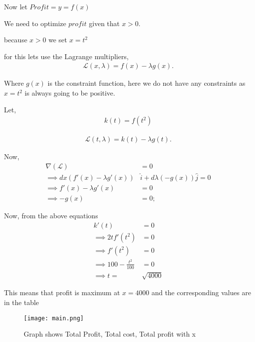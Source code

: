 \documentclass[journal,12pt,twocolumn]{IEEEtran}
\begin{document}
	Now let $Profit = y = f(x)$
	
	
	We need to optimize $profit$ given that $x > 0$.
	
	because $x>0$ we set $x = t^2$
	
	for this lets use the Lagrange multipliers,
	\begin{align}
	    \mathcal{L}(x, \lambda) = f(x) - \lambda g(x).
	\end{align}
	
	Where $g(x)$ is the constraint function, here we do not have any constraints as $x = t^2$
	is always going to be positive.
	
	Let,
	\begin{align}
	    k(t) = f(t^2)
	\end{align}
	
	\begin{align}
	    \mathcal{L}(t, \lambda) = k(t) - \lambda g(t).
	\end{align}
	
	Now,
	\begin{align}
	    \nabla(\mathcal{L}) &= 0\\
	    \implies dx(f'(x) - \lambda g'(x)) &\hat{i} + d\lambda (-g(x)) \hat{j} = 0 \\
	    \implies f'(x) - \lambda g'(x) &= 0 \\
	    \implies -g(x) &= 0;
	\end{align}
	
	Now, from the above equations
	\begin{align}
	    k'(t) &= 0 \\
	    \implies 2tf'(t^2) &= 0 \\ 
	    \implies f'(t^2) &= 0\\
	    \implies 100 - \frac{t^2}{100} &= 0 \\
	    \implies t =& \sqrt{4000}
	\end{align}
	
	This means that profit is maximum at $x=4000$ and the corresponding values are in the table
		
\begin{table}[h]
    \centering
	
\end{table}
	
\begin{figure}[!ht]
    \centering
    \texttt{[image: main.png]}
    \caption{Graph shows Total Profit, Total cost, Total profit with x}
    \label{fig:graph}
\end{figure}
\end{document}
